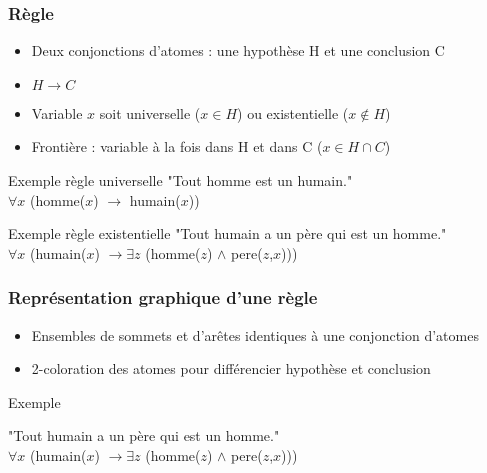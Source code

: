 \begin{frame}[t]
	\frametitle{Règle}
	\begin{center}
	\begin{itemize}
		\item Deux conjonctions d'atomes : une hypothèse H et une conclusion C
		\item $H \rightarrow C$
		\item Variable $x$ soit universelle ($x \in H$) ou existentielle ($x \notin H$)
		\item Frontière : variable à la fois dans H et dans C ($x \in H \cap C$)\\
	\end{itemize}

	\begin{exampleblock}{Exemple règle universelle}
		"Tout homme est un humain."\\
		$\forall x$ (homme($x$) $\rightarrow$ humain($x$))
	\end{exampleblock}

	\begin{exampleblock}{Exemple règle existentielle}
		"Tout humain a un père qui est un homme."\\
		$\forall x$ (humain($x$) $\rightarrow \exists z$ (homme($z$) $\wedge$ pere($z$,$x$)))
	\end{exampleblock}
	\end{center}
\end{frame}

\begin{frame}
	\frametitle{Représentation graphique d'une règle}
	\begin{center}
	\begin{itemize}
		\item Ensembles de sommets et d'arêtes identiques à une conjonction d'atomes
		\item 2-coloration des atomes pour différencier hypothèse et conclusion
	\end{itemize}
	\vspace{10mm}
	\begin{exampleblock}{Exemple}
		\begin{center}
		"Tout humain a un père qui est un homme."\\
		$\forall x$ (humain($x$) $\rightarrow \exists z$ (homme($z$) $\wedge$
		pere($z$,$x$)))
		\end{center}
	\end{exampleblock}
	\end{center}
\end{frame}

